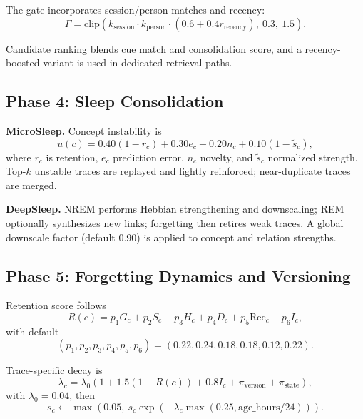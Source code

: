 \documentclass[11pt,a4paper]{article}
\begin{document}
The gate incorporates session/person matches and recency:
\begin{equation}
\Gamma = \mathrm{clip}\left(k_{\text{session}} \cdot k_{\text{person}} \cdot (0.6+0.4 r_{\text{recency}}),\ 0.3,\ 1.5\right).
\label{eq:context_gate}
\end{equation}

Candidate ranking blends cue match and consolidation score, and a recency-boosted variant is used in dedicated retrieval paths.

\subsection{Phase 4: Sleep Consolidation}
\textbf{MicroSleep.} Concept instability is
\begin{equation}
u(c)=0.40(1-r_c)+0.30e_c+0.20n_c+0.10(1-\tilde{s}_c),
\label{eq:instability}
\end{equation}
where $r_c$ is retention, $e_c$ prediction error, $n_c$ novelty, and $\tilde{s}_c$ normalized strength. Top-$k$ unstable traces are replayed and lightly reinforced; near-duplicate traces are merged.

\textbf{DeepSleep.} NREM performs Hebbian strengthening and downscaling; REM optionally synthesizes new links; forgetting then retires weak traces. A global downscale factor (default 0.90) is applied to concept and relation strengths.

\subsection{Phase 5: Forgetting Dynamics and Versioning}
Retention score follows
\begin{equation}
R(c)=p_1 G_c + p_2 S_c + p_3 H_c + p_4 D_c + p_5 \mathrm{Rec}_c - p_6 I_c,
\label{eq:retention}
\end{equation}
with default
\[
(p_1,p_2,p_3,p_4,p_5,p_6)=(0.22,0.24,0.18,0.18,0.12,0.22).
\]

Trace-specific decay is
\begin{equation}
\lambda_c=\lambda_0\left(1+1.5(1-R(c))+0.8I_c+\pi_{\text{version}}+\pi_{\text{state}}\right),
\label{eq:decay}
\end{equation}
with $\lambda_0=0.04$, then
\begin{equation}
s_c \leftarrow \max\left(0.05,\ s_c \exp\left(-\lambda_c \max(0.25,\mathrm{age\_hours}/24)\right)\right).
\label{eq:strength_decay}
\end{equation}
\end{document}
